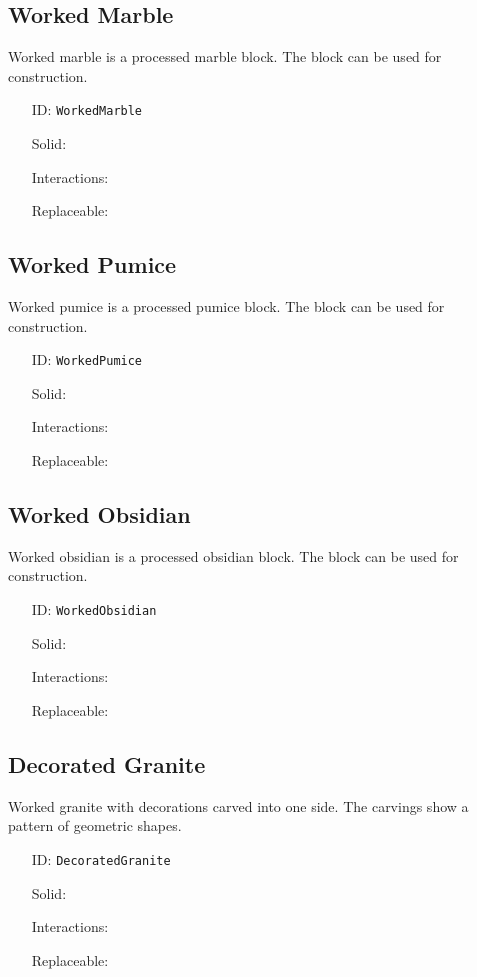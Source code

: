 \subsection{Worked Marble}\label{subsec:blocks_worked marble}
Worked marble is a processed marble block.
                The block can be used for construction.
\newline
\begin{itemize}[nosep]
\item[ID:] \texttt{WorkedMarble}
\item[Solid:]  \Checkmark \item[Interactions:]  \XSolidBrush \item[Replaceable:]  \XSolidBrush \end{itemize}

\subsection{Worked Pumice}\label{subsec:blocks_worked pumice}
Worked pumice is a processed pumice block.
                The block can be used for construction.
\newline
\begin{itemize}[nosep]
\item[ID:] \texttt{WorkedPumice}
\item[Solid:]  \Checkmark \item[Interactions:]  \XSolidBrush \item[Replaceable:]  \XSolidBrush \end{itemize}

\subsection{Worked Obsidian}\label{subsec:blocks_worked obsidian}
Worked obsidian is a processed obsidian block.
                The block can be used for construction.
\newline
\begin{itemize}[nosep]
\item[ID:] \texttt{WorkedObsidian}
\item[Solid:]  \Checkmark \item[Interactions:]  \XSolidBrush \item[Replaceable:]  \XSolidBrush \end{itemize}

\subsection{Decorated Granite}\label{subsec:blocks_decorated granite}
Worked granite with decorations carved into one side.
                The carvings show a pattern of geometric shapes.
\newline
\begin{itemize}[nosep]
\item[ID:] \texttt{DecoratedGranite}
\item[Solid:]  \Checkmark \item[Interactions:]  \XSolidBrush \item[Replaceable:]  \XSolidBrush \end{itemize}

